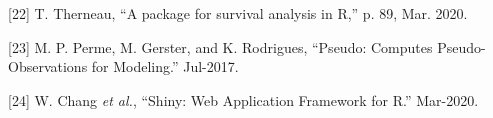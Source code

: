 \documentclass[
]{article}
\newenvironment{cslreferences}%
  {}%
  {\par}
\begin{document}
\begin{cslreferences}
\leavevmode\hypertarget{ref-therneau_package_2020}{}%
{[}22{]} T. Therneau, ``A package for survival analysis in R,'' p. 89, Mar. 2020.

\leavevmode\hypertarget{ref-perme_pseudo_2017}{}%
{[}23{]} M. P. Perme, M. Gerster, and K. Rodrigues, ``Pseudo: Computes Pseudo-Observations for Modeling.'' Jul-2017.

\leavevmode\hypertarget{ref-chang_shiny_2020}{}%
{[}24{]} W. Chang \emph{et al.}, ``Shiny: Web Application Framework for R.'' Mar-2020.
\end{cslreferences}
\end{document}
